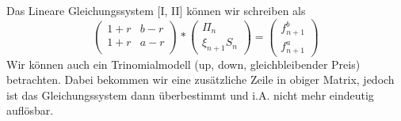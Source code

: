 \begin{*bemerkung_inline}
	Das Lineare Gleichungssystem [I, II] können wir schreiben als
	\begin{equation*}
		\begin{pmatrix}
			1+r & b - r \\
			1+r & a - r \\
		\end{pmatrix}
		* 
		\begin{pmatrix}
			\Pi_n \\ \xi_{n+1} S_n
		\end{pmatrix}
		= 
		\begin{pmatrix}
			f_{n+1}^b \\ f_{n+1}^a
		\end{pmatrix}
		\tag{LGS-1} \label{eq: 2_2_lgs-1}
	\end{equation*}
	Wir können auch ein Trinomialmodell (up, down, gleichbleibender Preis) betrachten. Dabei bekommen wir eine zusätzliche Zeile in obiger Matrix, jedoch ist das Gleichungssystem dann überbestimmt und i.A. nicht mehr eindeutig auflösbar.
\end{*bemerkung_inline}

